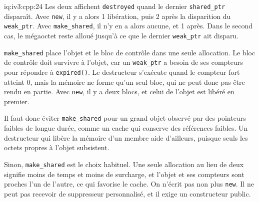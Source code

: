 \begin{solution}{iq:iv3:cpp:24}
Les deux affichent \texttt{destroyed} quand le dernier \texttt{shared\_ptr} disparaît. Avec \texttt{new}, il y a alors 1 libération, puis 2 après la disparition du \texttt{weak\_ptr}. Avec \texttt{make\_shared}, il n'y en a alors aucune, et 1 après. Dans le second cas, le mégaoctet reste alloué jusqu'à ce que le dernier \texttt{weak\_ptr} ait disparu.

\texttt{make\_shared} place l'objet et le bloc de contrôle dans une seule allocation. Le bloc de contrôle doit survivre à l'objet, car un \texttt{weak\_ptr} a besoin de ses compteurs pour répondre à \texttt{expired()}. Le destructeur s'exécute quand le compteur fort atteint 0, mais la mémoire ne forme qu'un seul bloc, qui ne peut donc pas être rendu en partie. Avec \texttt{new}, il y a deux blocs, et celui de l'objet est libéré en premier.

Il faut donc éviter \texttt{make\_shared} pour un grand objet observé par des pointeurs faibles de longue durée, comme un cache qui conserve des références faibles. Un destructeur qui libère la mémoire d'un membre aide d'ailleurs, puisque seuls les octets propres à l'objet subsistent.

Sinon, \texttt{make\_shared} est le choix habituel. Une seule allocation au lieu de deux signifie moins de temps et moins de surcharge, et l'objet et ses compteurs sont proches l'un de l'autre, ce qui favorise le cache. On n'écrit pas non plus \texttt{new}. Il ne peut pas recevoir de suppresseur personnalisé, et il exige un constructeur public.

\end{solution}

